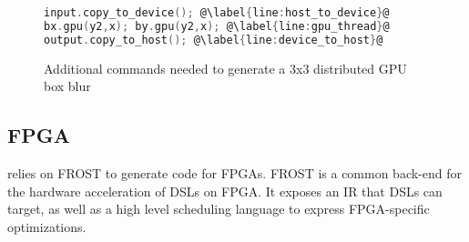 \begin{figure}
\begin{lstlisting}[language=C,escapechar=@]
input.copy_to_device(); @\label{line:host_to_device}@
bx.gpu(y2,x); by.gpu(y2,x); @\label{line:gpu_thread}@
output.copy_to_host(); @\label{line:device_to_host}@
\end{lstlisting}
\caption{Additional \framework{} commands needed to generate a 3x3 distributed GPU box blur}
\label{code:blurxy_gpu_addition}
\end{figure}
\subsection{FPGA}
\framework{} relies on FROST \cite{iccdFrost} to generate code for FPGAs.
FROST is a common back-end for the hardware acceleration of DSLs on FPGA. 
It exposes an IR that DSLs can target, as well as a high level scheduling language to express FPGA-specific optimizations.

